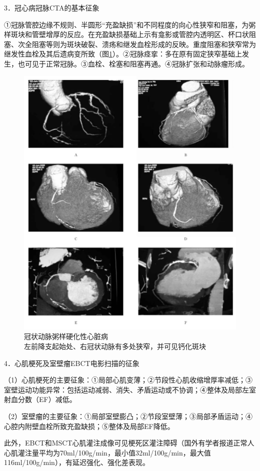 3．冠心病冠脉CTA的基本征象

①冠脉管腔边缘不规则、半圆形“充盈缺损”和不同程度的向心性狭窄和阻塞，为粥样斑块和管壁增厚的反应。在充盈缺损基础上示有龛影或管腔内透明区、杯口状阻塞、次全阻塞等则为斑块破裂、溃疡和继发血栓形成的反映。重度阻塞和狭窄常为继发性血栓及其后遗病变所致（图\ref{fig10-7}）。②冠脉痉挛：多在原有固定狭窄基础上发生，也可见于正常冠脉。③血栓、栓塞和阻塞再通。④冠脉扩张和动脉瘤形成。

\begin{figure}[!htbp]
 \centering
 \includegraphics[width=.7\textwidth,height=\textheight,keepaspectratio]{./images/Image00266.jpg}
 \captionsetup{justification=centering}
 \caption{冠状动脉粥样硬化性心脏病\\{\small 左前降支起始处、右冠状动脉有多处狭窄，并可见钙化斑块}}
 \label{fig10-7}
  \end{figure} 

4．心肌梗死及室壁瘤EBCT电影扫描的征象

（1）心肌梗死的主要征象：①局部心肌变薄；②节段性心肌收缩增厚率减低；③室壁运动功能异常：包括运动减弱、消失、矛盾运动或不协调；④整体及局部左室射血分数（EF）减低。

（2）室壁瘤的主要征象：①局部室壁膨凸；②节段室壁薄；③局部矛盾运动；④心腔内附壁血栓所致充盈缺损；⑤整体及局部EF降低。

此外，EBCT和MSCT心肌灌注成像可见梗死区灌注障碍（国外有学者报道正常人心肌灌注量平均为70ml/100g/min，最小值32ml/100g/min，最大值116ml/100g/min），有延迟强化、强化差表现。

